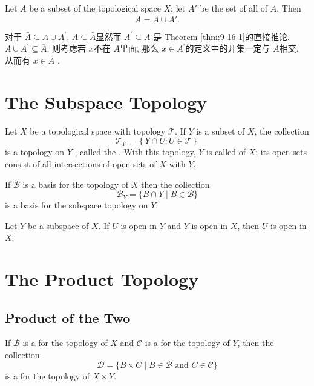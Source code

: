 \documentclass[../main.tex]{subfiles}
\begin{document}
\begin{theorem}{}{}
Let $A$ be a subset of the topological space $X$; let $A'$ be the set of all  of $A$. Then
\[ \bar{A} = A \cup A'. \]
\end{theorem}
\begin{proofsketch}
    对于 \(  \bar{A} \subseteq A\cup A^{\prime}   \), \(  A\subseteq \bar{A}  \)显然而  \(  A^{\prime} \subseteq A  \) 是 Theorem \ref{thm:9-16-1}的直接推论. \(  A\cup A^{\prime} \subseteq  \bar{A}  \), 则考虑若 \(  x  \)不在 \(  A  \)里面, 那么 \(  x\in A^{\prime}   \)的定义中的开集一定与 \(  A  \)相交, 从而有 \(  x \in \bar{A}  \) .     
\end{proofsketch}


\section{The Subspace Topology}

\begin{definition}{}{}
    Let \(  X  \) be a topological space with topology \(  \mathcal{T}  \). If \(  Y  \) is a subset of \(  X  \), the collection \[
    \mathcal{T}_{Y}= \left\{ Y\cap U:U\in \mathcal{T} \right\}
    \] is a topology on \(  Y  \) , called the .     With this topology, \(  Y  \) is called  of \(  X  \); its open sets consist of all intersections of open sets of \(  X  \) with \(  Y  \).    
\end{definition}

\begin{lemma}{}{}
If $\mathcal{B}$ is a basis for the topology of $X$ then the collection
\[
\mathcal{B}_Y = \{B \cap Y \mid B \in \mathcal{B}\}
\]
is a basis for the subspace topology on $Y$.
\end{lemma}
\begin{lemma}{}{}
Let $Y$ be a subspace of $X$. If $U$ is open in $Y$ and $Y$ is open in $X$, then $U$ is open in $X$.
\end{lemma}

\section{The Product Topology}

\subsection{Product of the Two}
\begin{theorem}{}{}
If $\mathcal{B}$ is a  for the topology of $X$ and $\mathcal{C}$ is a  for the topology of $Y$, then the collection
\[
\mathcal{D} = \{B \times C \mid B \in \mathcal{B} \text{ and } C \in \mathcal{C}\}
\]
is a  for the topology of $X \times Y$.
\end{theorem}
\end{document}
